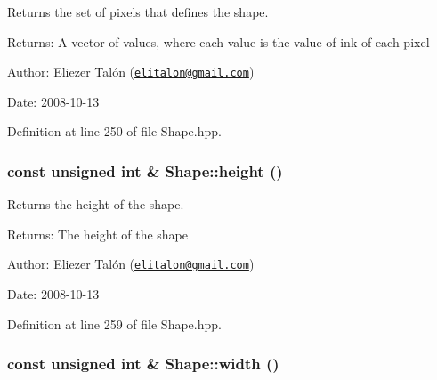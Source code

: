 Returns the set of pixels that defines the shape. 

\begin{Desc}
\item[Returns:]A vector of values, where each value is the value of ink of each pixel\end{Desc}
\begin{Desc}
\item[Author:]Eliezer Talón (\href{mailto:elitalon@gmail.com}{\tt elitalon@gmail.com}) \end{Desc}
\begin{Desc}
\item[Date:]2008-10-13 \end{Desc}


Definition at line 250 of file Shape.hpp.\hypertarget{class_shape_7a417d1fc74acae89f4d96ac36e0b73e}{
\subsubsection[height]{\setlength{\rightskip}{0pt plus 5cm}const unsigned int \& Shape::height ()}}
\label{class_shape_7a417d1fc74acae89f4d96ac36e0b73e}


Returns the height of the shape. 

\begin{Desc}
\item[Returns:]The height of the shape\end{Desc}
\begin{Desc}
\item[Author:]Eliezer Talón (\href{mailto:elitalon@gmail.com}{\tt elitalon@gmail.com}) \end{Desc}
\begin{Desc}
\item[Date:]2008-10-13 \end{Desc}


Definition at line 259 of file Shape.hpp.\hypertarget{class_shape_aa9328cb87de52f53496b6a1eb3a60b9}{
\subsubsection[width]{\setlength{\rightskip}{0pt plus 5cm}const unsigned int \& Shape::width ()}}
\label{class_shape_aa9328cb87de52f53496b6a1eb3a60b9}


